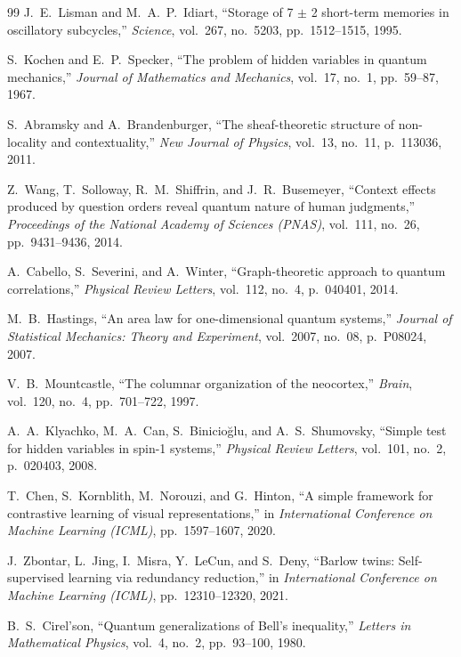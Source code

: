 \documentclass[10pt,twocolumn,3p]{article}
\begin{document}
\begin{thebibliography}{99}
J.~E.~Lisman and M.~A.~P.~Idiart,
``Storage of 7 $\pm$ 2 short-term memories in oscillatory subcycles,''
\textit{Science}, vol.~267, no.~5203, pp.~1512--1515, 1995.

S.~Kochen and E.~P.~Specker,
``The problem of hidden variables in quantum mechanics,''
\textit{Journal of Mathematics and Mechanics}, vol.~17, no.~1, pp.~59--87, 1967.

S.~Abramsky and A.~Brandenburger,
``The sheaf-theoretic structure of non-locality and contextuality,''
\textit{New Journal of Physics}, vol.~13, no.~11, p.~113036, 2011.

Z.~Wang, T.~Solloway, R.~M.~Shiffrin, and J.~R.~Busemeyer,
``Context effects produced by question orders reveal quantum nature of human judgments,''
\textit{Proceedings of the National Academy of Sciences (PNAS)}, vol.~111, no.~26, pp.~9431--9436, 2014.

A.~Cabello, S.~Severini, and A.~Winter,
``Graph-theoretic approach to quantum correlations,''
\textit{Physical Review Letters}, vol.~112, no.~4, p.~040401, 2014.

M.~B.~Hastings,
``An area law for one-dimensional quantum systems,''
\textit{Journal of Statistical Mechanics: Theory and Experiment}, vol.~2007, no.~08, p.~P08024, 2007.

V.~B.~Mountcastle,
``The columnar organization of the neocortex,''
\textit{Brain}, vol.~120, no.~4, pp.~701--722, 1997.

A.~A.~Klyachko, M.~A.~Can, S.~Binicio\u{g}lu, and A.~S.~Shumovsky,
``Simple test for hidden variables in spin-1 systems,''
\textit{Physical Review Letters}, vol.~101, no.~2, p.~020403, 2008.

T.~Chen, S.~Kornblith, M.~Norouzi, and G.~Hinton,
``A simple framework for contrastive learning of visual representations,''
in \textit{International Conference on Machine Learning (ICML)}, pp.~1597--1607, 2020.

J.~Zbontar, L.~Jing, I.~Misra, Y.~LeCun, and S.~Deny,
``Barlow twins: Self-supervised learning via redundancy reduction,''
in \textit{International Conference on Machine Learning (ICML)}, pp.~12310--12320, 2021.

B.~S.~Cirel'son,
``Quantum generalizations of Bell's inequality,''
\textit{Letters in Mathematical Physics}, vol.~4, no.~2, pp.~93--100, 1980.


\end{thebibliography}
\end{document}
